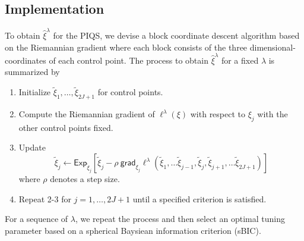 \documentclass[a0,portrait]{a0poster}
\begin{document}
\begin{multicols}{2}

\section*{Implementation}
To obtain $\hat{\xi}^{\lambda}$ for the PIQS, we devise a
block coordinate descent algorithm based on the Riemannian gradient where each block consists of the three dimensional-coordinates of each control point.
The process to obtain $\hat{\xi}^{\lambda}$ for a fixed $\lambda$ is summarized by
\vspace{0.2cm}
\begin{center}
\begin{enumerate}
\item
Initialize $\tilde{\xi}_1, \ldots, \tilde{\xi}_{2J + 1}$ for control points.
\vspace{0.2cm}
\item
Compute the Riemannian gradient of $\ell^{\lambda}(\xi)$ with respect to $\xi_j$ with the other control points fixed.
\vspace{0.2cm}
\item
Update
$$
\tilde{\xi}_j \leftarrow \mathsf{Exp}_{\tilde{\xi}_j} \left[ \tilde{\xi}_j -
\rho \ \mathsf{grad}_{{\xi}_j} \ell^{\lambda}(\tilde{\xi}_1, \ldots \tilde{\xi}_{j-1},
\tilde{\xi}_j, \tilde{\xi}_{j+1}, \ldots \tilde{\xi}_{2J + 1}) \right]
$$
where $\rho$ denotes a step size.
\vspace{0.2cm}
\item
Repeat 2-3 for $j = 1, \ldots, 2J + 1$
until a specified criterion is satisfied.
\end{enumerate}
\end{center}


For a sequence of $\lambda$, we repeat the process and then select an optimal tuning parameter based on a spherical Baysiean information criterion (sBIC).

\vspace{3cm}
\begin{center}

\end{center}




\end{multicols}
\end{document}
